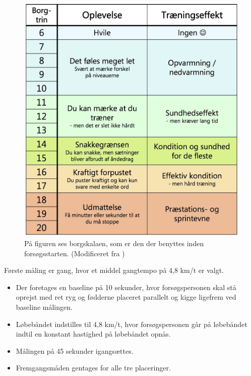 \begin{figure}[H]
	\centering
	\includegraphics[scale=0.2]{figures/qBilag/Borg-skala.jpg}
	\caption{På figuren ses borgskalaen, som er den der benyttes inden forsøgsstarten. (Modificeret fra \cite{KILDE})}
	\label{fig:borgskala}
\end{figure}

Første måling er gang, hvor et middel gangtempo på 4,8 km/t er valgt\citep{Miles 2007}. \vspace{-3mm}
\begin{itemize}
		\item Der foretages en baseline på 10 sekunder, hvor forsøgspersonen skal stå oprejst med ret ryg og fødderne placeret parallelt og kigge ligefrem ved baseline målingen.
		\item Løbebåndet indstilles til 4,8 km/t, hvor forsøgspersonen går på løbebåndet indtil en konstant hastighed på løbebåndet opnås. 
		\item Målingen på 45 sekunder igangsættes.
		\item Fremgangsmåden gentages for alle tre placeringer. 
\end{itemize}
 

